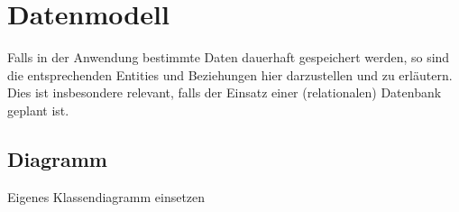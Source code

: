 \chapter{Datenmodell}
Falls in der Anwendung bestimmte Daten dauerhaft gespeichert werden, so sind
die entsprechenden Entities und Beziehungen hier darzustellen und zu erl\"autern.
Dies ist insbesondere relevant, falls der Einsatz einer (relationalen)
Datenbank geplant ist.

\section{Diagramm}

Eigenes Klassendiagramm einsetzen
